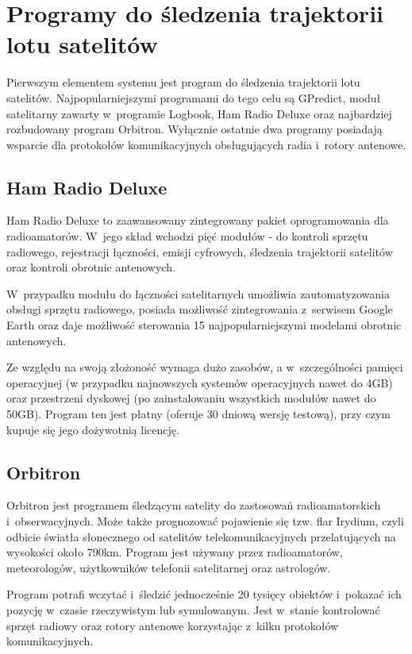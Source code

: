 \documentclass[eng,oneside]{mgr}
\begin{document}
		\section{Programy do śledzenia trajektorii lotu satelitów}
		Pierwszym elementem systemu jest program do śledzenia trajektorii lotu satelitów. Najpopularniejszymi programami do tego celu są GPredict, moduł satelitarny zawarty w~programie Logbook, Ham Radio Deluxe oraz najbardziej rozbudowany program Orbitron. Wyłącznie ostatnie dwa programy posiadają wsparcie dla protokołów komunikacyjnych obsługujących radia i~rotory antenowe.

			\subsection{Ham Radio Deluxe}
			Ham Radio Deluxe to zaawansowany zintegrowany pakiet oprogramowania dla radioamatorów. W~jego skład wchodzi pięć modułów - do kontroli sprzętu radiowego, rejestracji łączności, emisji cyfrowych, śledzenia trajektorii satelitów oraz kontroli obrotnic antenowych.

			W~przypadku modułu do łączności satelitarnych umożliwia zautomatyzowania obsługi sprzętu radiowego, posiada możliwość zintegrowania z~serwisem Google Earth oraz daje możliwość sterowania 15 najpopularniejszymi modelami obrotnic antenowych.

			Ze względu na swoją złożoność wymaga dużo zasobów, a w~szczególności pamięci operacyjnej (w przypadku najnowszych systemów operacyjnych nawet do 4GB) oraz przestrzeni dyskowej (po zainstalowaniu wszystkich modułów nawet do 50GB). Program ten jest płatny (oferuje 30 dniową wersję testową), przy czym kupuje się jego dożywotnią licencję.

			\subsection{Orbitron}
			Orbitron jest programem śledzącym satelity do zastosowań radioamatorskich i~obserwacyjnych. Może także prognozować pojawienie się tzw. flar Irydium, czyli odbicie światła słonecznego od satelitów telekomunikacyjnych przelatujących na wysokości około 790km. Program jest używany przez radioamatorów, meteorologów, użytkowników telefonii satelitarnej oraz astrologów.

			Program potrafi wczytać i~śledzić jednocześnie 20 tysięcy obiektów i~pokazać ich pozycję w~czasie rzeczywistym lub symulowanym. Jest w~stanie kontrolować sprzęt radiowy oraz rotory antenowe korzystając z~kilku protokołów komunikacyjnych.
\end{document}
